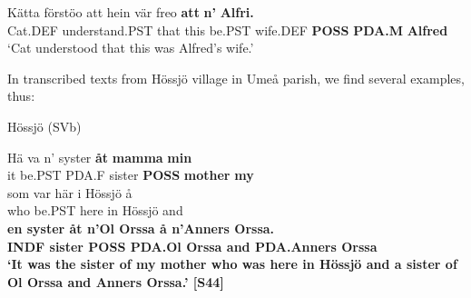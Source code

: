  \ea\label{}
\gll Kätta  förstöo  att  hein  vär  freo  \textbf{att}\textbf{  n’}\textbf{  Alfri.}\\


Cat.DEF  understand.PST  that  this  be.PST  wife.DEF  \textbf{POSS} \textbf{PDA.M} \textbf{Alfred}\\

\glt ‘Cat understood that this was Alfred’s wife.’

\z

In transcribed texts from Hössjö village in Umeå parish, we find several examples, thus:


\item 

Hössjö (SVb)



\item 


 \ea\label{}
\gll Hä  va  n’  syster  \textbf{åt}\textbf{  mamma}\textbf{  min}\\


it  be.PST  PDA.F  sister  \textbf{POSS} \textbf{mother} \textbf{my}\\

 \ea\label{}
\gll som  var  här  i  Hössjö  å\\


who  be.PST  here  in  Hössjö  and\\

 \ea\label{}\gll\bfseries
en  syster  åt  n’Ol  Orssa  å  n’Anners  Orssa.\\

\bfseries
INDF  sister   POSS  PDA.Ol  Orssa  and  PDA.Anners  Orssa\\

\glt ‘It was the sister of my mother who was here in Hössjö and a sister of Ol Orssa and Anners Orssa.’ [S44]

